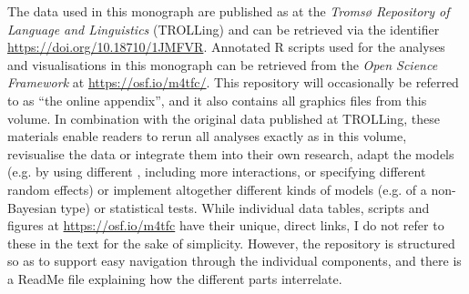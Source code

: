 The data used in this monograph are published as \citet{Schützler2021} at the \textit{Tromsø Repository of Language and Linguistics} (TROLLing) and can be retrieved via the identifier \url{https://doi.org/10.18710/1JMFVR}. Annotated R scripts used for the analyses and visualisations in this monograph can be retrieved from the \textit{Open Science Framework} at \url{https://osf.io/m4tfc/}. This repository will occasionally be referred to as “the online appendix”, and it also contains all graphics files from this volume. In combination with the original data published at TROLLing, these materials enable readers to rerun all analyses exactly as in this volume, revisualise the data or integrate them into their own research, adapt the models (e.g. by using different , including more interactions, or specifying different random effects) or implement altogether different kinds of models (e.g. of a non-Bayesian type) or statistical tests. While individual data tables, scripts and figures at \url{https://osf.io/m4tfc} have their unique, direct links, I do not refer to these in the text for the sake of simplicity. However, the repository is structured so as to support easy navigation through the individual components, and there is a ReadMe file explaining how the different parts interrelate.
